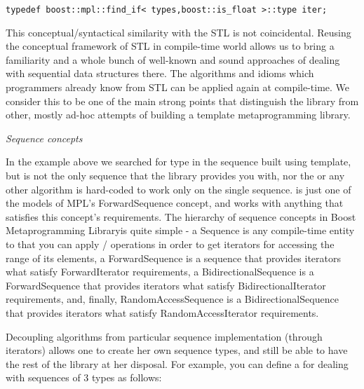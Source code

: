\documentclass{netobjectdays}
\newcommand{\Mpl}{Boost Meta\-program\-ming Library}
\begin{document}
{\footnotesize
\begin{verbatim}
typedef boost::mpl::find_if< types,boost::is_float >::type iter;
\end{verbatim}
}

This conceptual/syntactical similarity with the STL is not 
coincidental. Reusing the conceptual framework of STL in 
compile-time world allows us to bring a familiarity and a whole 
bunch of well-known and sound approaches of dealing with 
sequential data structures there. The algorithms and idioms 
which programmers already know from STL can be applied again at 
compile-time. We consider this to be one of the main strong 
points that distinguish the library from other, mostly ad-hoc 
attempts of building a template metaprogramming library.
  

\emph{Sequence concepts}

In the  example above we searched for type in the 
sequence built using  template, but 
 is not the only sequence that the library provides 
you with, nor the  or any other 
algorithm is hard-coded to work only on the single 
 sequence.  is just one of the models of 
MPL's ForwardSequence concept, and  works with 
anything that satisfies this concept's requirements. The 
hierarchy of sequence concepts in \Mpl is quite simple - a 
Sequence is any compile-time entity to that you can apply 
/ operations in order to get iterators 
for accessing the range of its elements, a ForwardSequence 
is a sequence that provides iterators what satisfy 
ForwardIterator requirements, a BidirectionalSequence is a 
ForwardSequence that provides iterators what satisfy 
BidirectionalIterator requirements, and, finally, 
RandomAccessSequence is a BidirectionalSequence that provides 
iterators what satisfy RandomAccessIterator requirements. 

Decoupling algorithms from particular sequence implementation 
(through iterators) allows one to create her own sequence 
types, and still be able to have the rest of the library at 
her disposal. For example, you can define a 
for dealing with sequences of 3 types as follows:
\end{document}
